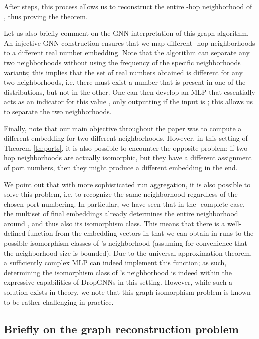 \documentclass{article}
\begin{document}
After  steps, this process allows us to reconstruct the entire -hop neighborhood of , thus proving the theorem.

Let us also briefly comment on the GNN interpretation of this graph algorithm. An injective GNN construction ensures that we map different -hop neighborhoods to a different real number embedding. Note that the algorithm can separate any two neighborhoods without using the frequency of the specific neighborhoods variants; this implies that the set of real numbers obtained is different for any two neighborhoods, i.e. there must exist a number  that is present in one of the distributions, but not in the other. One can then develop an MLP that essentially acts as an indicator for this value , only outputting  if the input is ; this allows us to separate the two neighborhoods.

Finally, note that our main objective throughout the paper was to compute a different embedding for two different neighborhoods. However, in this setting of Theorem \ref{th:ports}, it is also possible to encounter the opposite problem: if two -hop neighborhoods are actually isomorphic, but they have a different assignment of port numbers, then they might produce a different embedding in the end.

We point out that with more sophisticated run aggregation, it is also possible to solve this problem, i.e. to recognize the same neighborhood regardless of the chosen port numbering. In particular, we have seen that in the -complete case, the multiset of final embeddings already determines the entire neighborhood around , and thus also its isomorphism class. This means that there is a well-defined function from the embedding vectors in  that we can obtain in  runs to the possible isomorphism classes of 's neighborhood (assuming for convenience that the neighborhood size is bounded). Due to the universal approximation theorem, a sufficiently complex MLP can indeed implement this function; as such, determining the isomorphism class of 's neighborhood is indeed within the expressive capabilities of DropGNNs in this setting. However, while such a solution exists in theory, we note that this graph isomorphism problem is known to be rather challenging in practice.

\subsection{Briefly on the graph reconstruction problem}
\end{document}
